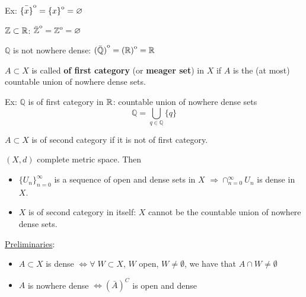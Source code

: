 Ex: \({\kern0pt\bar{\{x\}}}^{\mathrm{o}} = {\kern0pt\{x\}}^{\mathrm{o}} = \varnothing\)

\(\mathbb{Z} \subset \mathbb{R}\): \({\kern0pt\bar{\mathbb{Z}}}^{\mathrm{o}}={\kern0pt\mathbb{Z}}^{\mathrm{o}} = \varnothing\)

\(\mathbb{Q} \) is not nowhere dense: \({\kern0pt(\bar{\mathbb{Q}})}^{\mathrm{o}} = {\kern0pt(\mathbb{R})}^{\mathrm{o}} = \mathbb{R} \)
\begin{definition}
    \(A \subset X\) is called \textbf{of first category} (or \textbf{meager set}) in \(X\) if \(A\) is the (at most) countable union of nowhere dense sets. 
\end{definition}

Ex: \(\mathbb{Q}\) is of first category in \(\mathbb{R}\): countable union of nowhere dense sets
\[
    \mathbb{Q} = \bigcup_{q \in \mathbb{Q}} \{q\}
\]
\begin{definition}
    \(A \subset X\) is of second category if it is not of first category.
\end{definition}
\begin{theorem}
    \((X, d)\) complete metric space. Then 
    \begin{itemize}
        \item \(\{U_n\}_{n=0}^\infty\) is a sequence of open and dense sets in \(X\) \(\Rightarrow \cap_{n=0}^\infty U_n\) is dense in \(X\).
        \item \(X\) is of second category in itself: \(X\) cannot be the countable union of nowhere dense sets. 
    \end{itemize}
\end{theorem}


\noindent\underline{Preliminaries}:
\begin{itemize}
    \item \(A \subset X\) is dense \(\Leftrightarrow \forall \; W \subset X\), \(W\) open, \(W \neq \emptyset\), we have that \(A \cap W \neq \emptyset\)
    \item \(A\) is nowhere dense \(\Leftrightarrow \left(\bar{A}\right)^C\) is open and dense
\end{itemize}


